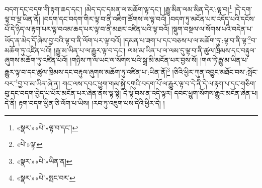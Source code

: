 བདག་དང་བདག་གི་རྟག་ཆད་དང་། །མེད་དང་དམན་ལ་མཆོག་ལྟ་དང་། །རྒྱུ་མིན་ལམ་མིན་དེར་:ལྟ་བ།\footnote{«སྣར་»«པེ་»ལྟ་བ་དང་།} །དེ་དག་ལྟ་བ་ལྔ་ཡིན་ནོ། །བདག་དང་བདག་གིར་ལྟ་བ་ནི་འཇིག་ཚོགས་ལ་ལྟ་བའོ། །བདག་ཏུ་མངོན་པར་འདོད་པའི་དངོས་པོ་དེ་ཉིད་ལ་རྟག་པར་ལྟ་བའམ་ཆད་པར་ལྟ་བ་ནི་མཐར་འཛིན་པའི་ལྟ་བའོ། །སྡུག་བསྔལ་ལ་སོགས་པའི་བདེན་པ་ཡོད་ན་མེད་དོ་ཞེས་བྱ་བའི་ལྟ་བ་ནི་ལོག་པར་ལྟ་བའོ། །དམན་པ་ཟག་པ་དང་བཅས་པ་ལ་མཆོག་ཏུ་:ལྟ་བ་ནི་ལྟ་\footnote{«པེ་»ལྟ་}བ་མཆོག་ཏུ་འཛིན་པའོ། །རྒྱུ་མ་ཡིན་པ་ལ་རྒྱུར་ལྟ་བ་དང་། ལམ་མ་ཡིན་པ་ལ་ལམ་དུ་ལྟ་བ་ནི་ཚུལ་ཁྲིམས་དང་བརྟུལ་ཞུགས་མཆོག་ཏུ་འཛིན་པའོ། །གཉིས་ཀ་ལ་ཡང་ལ་སོགས་པའི་སྒྲ་མི་མངོན་པར་བྱས་སོ། །གལ་ཏེ་རྒྱུ་མ་ཡིན་པ་རྒྱུར་ལྟ་བ་དང་ཚུལ་ཁྲིམས་དང་བརྟུལ་ཞུགས་མཆོག་ཏུ་འཛིན་པ་:ཡིན་ནོ།\footnote{«སྣར་»«པེ་»ཡིན་ན།} །ཅིའི་ཕྱིར་ཀུན་འབྱུང་མཐོང་བས་:སྤོང་བར་\footnote{«སྣར་»«པེ་»སྤང་བར་}བྱ་བ་མ་ཡིན་ཞེ་ན། གང་ལས་དབང་ཕྱུག་གམ་སྐྱེ་དགུའི་བདག་པོ་ལ་རྒྱུར་ལྟ་བ་དེ་ནི་དེ་ལ་རྟག་པ་དང་གཅིག་བུ་དང་བདག་བྱེད་པ་པོར་མངོན་པར་ཞེན་ནས་ལྟ་སྟེ། དེ་ལྟ་བས་ན་འདི་ལྟར། དབང་ཕྱུག་སོགས་རྒྱུར་མངོན་ཞེན་པ། དེ་ནི། རྟག་བདག་ཕྱིན་ཅི་ལོག་པ་ཡིས། །རབ་ཏུ་འཇུག་པས་དེའི་ཕྱིར་དེ། །
